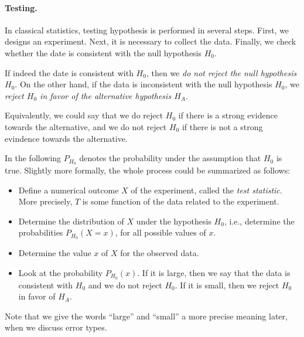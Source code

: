 
\paragraph{Testing.}
In classical statistics, testing hypothesis is performed in several steps.
First, we designs an experiment.
Next, it is necessary to collect the data.
Finally, we check whether the date is consistent with the null hypothesis $H_0$.

If indeed the date is consistent with $H_0$, then we \emph{do not reject the null hypothesis $H_0$}.
On the other hand, if the data is inconsistent with the null hypothesis $H_0$, we \emph{reject $H_0$ in favor of the alternative hypothesis $H_A$}.

Equivalently, we could say that we do reject $H_0$ if there is a strong evidence towards the alternative, and we do not reject $H_0$ if there is not a strong evindence towards the alternative.

In the following $P_{H_0}$ denotes the probability under the assumption that $H_0$ is true.
Slightly more formally, the whole process could be summarized as follows:
\begin{itemize}
\item
Define a numerical outcome $X$ of the experiment, called the \emph{test statistic}.
More precisely, $T$ is some function of the data related to the experiment.
\item
Determine the distribution of $X$ under the hypothesis $H_0$, i.e., determine the probabilities $P_{H_0}(X=x)$, for all possible values of $x$.
\item
Determine the value $x$ of $X$ for the observed data.
\item
Look at the probability $P_{H_0}(x)$.
If it is large, then we say that the data is consistent with $H_0$ and we do not reject $H_0$.
If it is small, then we reject $H_0$ in favor of $H_A$.
\end{itemize}
Note that we give the words ``large'' and ``small'' a more precise meaning later, when we discuss error types.


